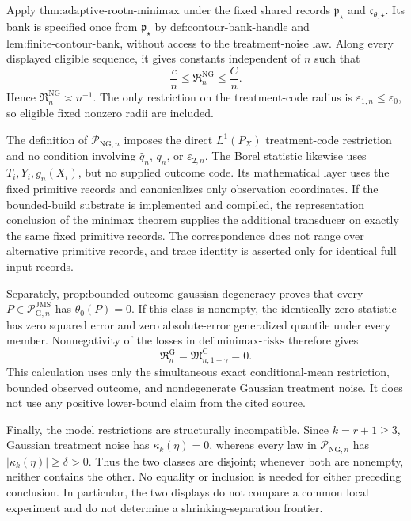 Apply \(\text{thm:adaptive-rootn-minimax}\) under the fixed shared records
\(\mathfrak p_{\star}\) and \(\mathfrak c_{\theta,\star}\).  Its bank is
specified once from \(\mathfrak p_{\star}\) by
\(\text{def:contour-bank-handle}\) and
\(\text{lem:finite-contour-bank}\), without access to the treatment-noise
law.  Along every displayed eligible sequence, it gives constants
independent of \(n\) such that
\[
 \frac cn\le\mathfrak R_n^{\mathrm{NG}}\le\frac Cn.
\]
Hence \(\mathfrak R_n^{\mathrm{NG}}\asymp n^{-1}\).  The only restriction
on the treatment-code radius is \(\varepsilon_{1,n}\le\varepsilon_0\), so
eligible fixed nonzero radii are included.

The definition of \(\mathcal P_{\mathrm{NG},n}\) imposes the direct
\(L^1(P_X)\) treatment-code restriction and no condition involving
\(\widehat q_n\), \(\bar q_n\), or \(\varepsilon_{2,n}\).  The Borel
statistic likewise uses \(T_i,Y_i,\bar g_n(X_i)\), but no supplied outcome
code.  Its mathematical layer uses the fixed primitive records and
canonicalizes only observation coordinates.  If the bounded-build substrate
is implemented and compiled, the representation conclusion of the minimax
theorem supplies the additional transducer on exactly the same fixed
primitive records.  The correspondence does not range over alternative
primitive records, and trace identity is asserted only for identical full
input records.

Separately, \(\text{prop:bounded-outcome-gaussian-degeneracy}\) proves that
every \(P\in\mathcal P_{\mathrm G,n}^{\mathrm{JMS}}\) has
\(\theta_0(P)=0\).  If this class is nonempty, the identically zero statistic
has zero squared error and zero absolute-error generalized quantile under
every member.  Nonnegativity of the losses in \(\text{def:minimax-risks}\)
therefore gives
\[
 \mathfrak R_n^{\mathrm G}
 =\mathfrak M_{n,1-\gamma}^{\mathrm G}=0.
\]
This calculation uses only the simultaneous exact conditional-mean
restriction, bounded observed outcome, and nondegenerate Gaussian treatment
noise.  It does not use any positive lower-bound claim from the cited source.

Finally, the model restrictions are structurally incompatible.  Since
\(k=r+1\ge3\), Gaussian treatment noise has \(\kappa_k(\eta)=0\), whereas
every law in \(\mathcal P_{\mathrm{NG},n}\) has
\(|\kappa_k(\eta)|\ge\delta>0\).  Thus the two classes are disjoint; whenever
both are nonempty, neither contains the other.  No equality or inclusion is
needed for either preceding conclusion.  In particular, the two displays do
not compare a common local experiment and do not determine a
shrinking-separation frontier.